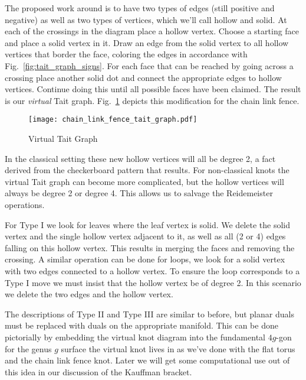 \documentclass{article}
\theoremstyle{plain}
\begin{document}
        \par\hfill\par
        The proposed work around is to have two types of edges (still positive
        and negative) as well as two types of vertices, which we'll call
        hollow and solid. At each of the crossings in the diagram place a
        hollow vertex. Choose a starting face and place a solid vertex in it.
        Draw an edge from the solid vertex to all hollow vertices that border
        the face, coloring the edges in accordance with
        Fig.~\ref{fig:tait_graph_signs}. For each face that can be reached
        by going across a crossing place another solid dot and connect the
        appropriate edges to hollow vertices. Continue doing this until all
        possible faces have been claimed. The result is our
        \textit{virtual} Tait graph. Fig.~\ref{fig:chain_link_fence_tait_graph}
        depicts this modification for the chain link fence.
        \begin{figure}
            \centering
            \texttt{[image: chain\_link\_fence\_tait\_graph.pdf]}
            \caption{Virtual Tait Graph}
            \label{fig:chain_link_fence_tait_graph}
        \end{figure}
        \par\hfill\par
        In the classical setting these new hollow vertices will all be
        degree 2, a fact derived from the checkerboard pattern that results.
        For non-classical knots the virtual Tait graph can become more
        complicated, but the hollow vertices will always be degree 2 or
        degree 4. This allows us to salvage the Reidemeister operations.
        \par\hfill\par
        For Type I we look for leaves where the leaf vertex is solid. We
        delete the solid vertex and the single hollow vertex adjacent to it,
        as well as all (2 or 4) edges falling on this hollow vertex. This
        results in merging the faces and removing the crossing. A similar
        operation can be done for loops, we look for a solid vertex with two
        edges connected to a hollow vertex. To ensure the loop
        corresponds to a Type I move we must insist that the hollow vertex be
        of degree 2. In this scenario we delete the two edges and the hollow
        vertex.
        \par\hfill\par
        The descriptions of Type II and Type III are similar to before, but
        planar duals must be replaced with duals on the appropriate manifold.
        This can be done pictorially by embedding the virtual knot diagram into
        the fundamental $4g$-gon for the genus $g$ surface the virtual knot
        lives in as we've done with the flat torus and the
        chain link fence knot. Later we will get some computational use out of
        this idea in our discussion of the Kauffman bracket.
\end{document}
